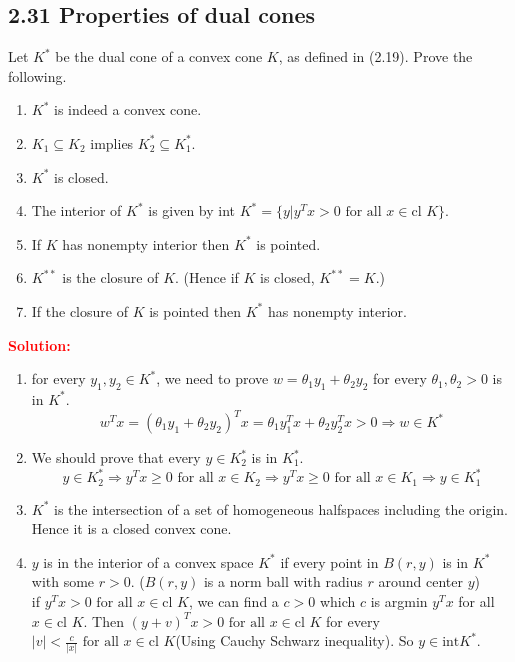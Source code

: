 \documentclass[a4paper]{article}
\begin{document}
\begin{latin}
\section{2.31 Properties of dual cones}
Let $ K^{*} $ be the dual cone of a convex cone $ K $, as defined in (2.19). Prove the following.
\begin{enumerate}
	\item $ K^{*} $ is indeed a convex cone.
	\item $ K_{1} \subseteq K_{2} $ implies $ K_{2}^{*} \subseteq K_{1}^{*} $.
	\item $ K^{*} $ is closed.
	\item The interior of $ K^{*} $ is given by int $ K^{*} = \{y | y^{T} x > 0 \text{ for all } x \in \text{cl } K \}$.
	\item If $ K $ has nonempty interior then $ K^{*} $ is pointed.
	\item $ K^{**} $ is the closure of $ K $. (Hence if $ K $ is closed,  $ K^{**} = K $.)
	\item If the closure of $ K $ is pointed then $ K^{*} $ has nonempty interior.
\end{enumerate}
\textcolor{red}{\textbf{Solution:}}
\begin{enumerate}
	\item for every $ y_{1},y_{2} \in K^{*}$, we need to prove $ w = \theta_{1} y_{1} + \theta_{2} y_{2} $ for every $ \theta_{1},\theta_{2}>0 $ is in $ K^{*} $.
	\begin{equation*}
		w^{T}x = (\theta_{1} y_{1} + \theta_{2} y_{2})^{T}x = \theta_{1} y_{1}^{T}x + \theta_{2} y_{2}^{T}x > 0 \Rightarrow w \in K^{*}
	\end{equation*}
	\item 
	We should prove that every $ y \in K_{2}^{*} $ is in $ K_{1}^{*} $.
	\begin{equation*}
		y \in K_{2}^{*}	\Rightarrow y^{T}x \geq 0 \text{ for all } x \in K_{2} \Rightarrow y^{T}x \geq 0 \text{ for all } x \in K_{1} \Rightarrow y \in K_{1}^{*}
	\end{equation*}
	\item 
	$ K^{*} $ is the intersection of a set of homogeneous halfspaces including the origin. Hence it is a closed convex cone.
	\item 
	$ y $ is in the interior of a convex space $ K^{*} $ if every point in $ B(r,y) $ is in $ K^{*} $ with some $ r>0 $. ($ B(r,y) $ is a norm ball with radius $ r $ around center $ y $)
	\\
	if $ y^{T}x > 0 \text{ for all } x \in \text{cl } K $, we can find a $ c > 0 $ which $ c $ is argmin $ y^{T}x $ for all $ x \in \text{cl } K $. Then $ (y+v)^{T}x > 0 \text{ for all } x \in \text{cl } K $ for every $ |v| < \frac{c}{|x|} \text{ for all } x \in \text{cl } K $(Using Cauchy Schwarz inequality). So $ y \in \text{int} K^{*} $. 

\end{enumerate}
\end{latin}
\end{document}
